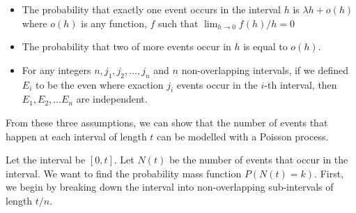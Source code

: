 \documentclass{article}
\begin{document}
\begin{itemize}
\item The probability that exactly one event occurs in the interval $h$ is $\lambda h + o(h)$ where $o(h)$ is any function, $f$ such that $\lim_{h \xrightarrow{} 0} f(h) / h = 0$
\item The probability that two of more events occur in $h$ is equal to $o(h)$.
\item For any integers $n, j_1, j_2, \dots, j_n$ and $n$ non-overlapping intervals, if we defined $E_i$ to be the even where exaction $j_i$ events occur in the $i$-th interval, then $E_1, E_2, \dots E_n$ are independent.
\end{itemize}
From these three assumptions, we can show that the number of events that happen at each interval of length $t$ can be modelled with a Poisson process.

Let the interval be $[0, t]$. Let $N(t)$ be the number of events that occur in the interval. We want to find the probability mass function $P(N(t) = k)$. First, we begin by breaking down the interval into non-overlapping sub-intervals of length $t / n$.
\end{document}
